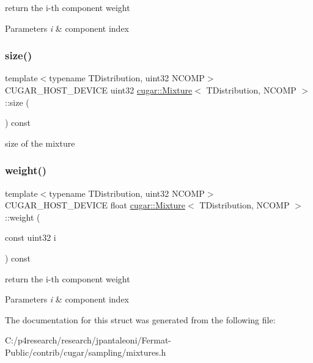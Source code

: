 return the i-\/th component weight


\begin{DoxyParams}{Parameters}
{\em i} & component index \\
\hline
\end{DoxyParams}
\mbox{\label{structcugar_1_1_mixture_a2e54c53e471a88e775802c2c15804fe5}} 
\subsubsection{\texorpdfstring{size()}{size()}}
{\footnotesize\ttfamily template$<$typename T\+Distribution, uint32 N\+C\+O\+MP$>$ \\
C\+U\+G\+A\+R\+\_\+\+H\+O\+S\+T\+\_\+\+D\+E\+V\+I\+CE uint32 \hyperlink{structcugar_1_1_mixture}{cugar\+::\+Mixture}$<$ T\+Distribution, N\+C\+O\+MP $>$\+::size (\begin{DoxyParamCaption}{ }\end{DoxyParamCaption}) const\hspace{0.3cm}{\ttfamily [inline]}}

size of the mixture \mbox{\label{structcugar_1_1_mixture_aca3cf56f710173842eb6fac00415ce79}} 
\subsubsection{\texorpdfstring{weight()}{weight()}}
{\footnotesize\ttfamily template$<$typename T\+Distribution, uint32 N\+C\+O\+MP$>$ \\
C\+U\+G\+A\+R\+\_\+\+H\+O\+S\+T\+\_\+\+D\+E\+V\+I\+CE float \hyperlink{structcugar_1_1_mixture}{cugar\+::\+Mixture}$<$ T\+Distribution, N\+C\+O\+MP $>$\+::weight (\begin{DoxyParamCaption}\item[{const uint32}]{i }\end{DoxyParamCaption}) const\hspace{0.3cm}{\ttfamily [inline]}}

return the i-\/th component weight


\begin{DoxyParams}{Parameters}
{\em i} & component index \\
\hline
\end{DoxyParams}


The documentation for this struct was generated from the following file\+:\begin{DoxyCompactItemize}
\item 
C\+:/p4research/research/jpantaleoni/\+Fermat-\/\+Public/contrib/cugar/sampling/mixtures.\+h\end{DoxyCompactItemize}
